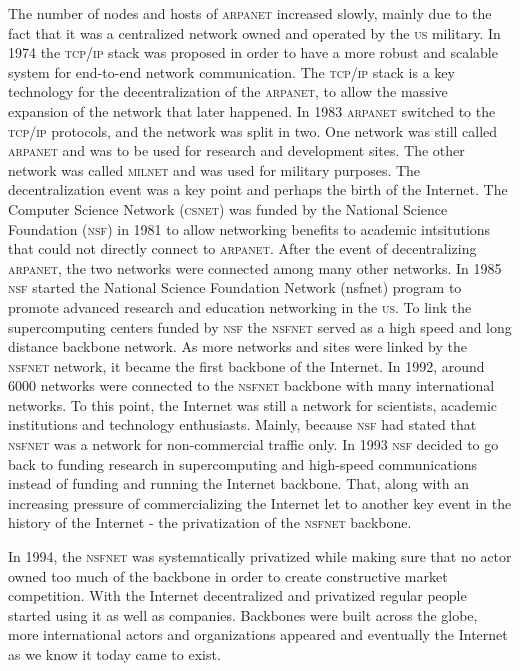 \documentclass[a4paper,11pt]{kth-mag}
\begin{document}
        The number of nodes and hosts of \textsc{arpanet} increased slowly, mainly due to the fact that it was a centralized network owned and operated by the \textsc{us} military.
        In 1974 the \textsc{tcp/ip} stack was proposed in order to have a more robust and scalable system for end-to-end network communication.
        The \textsc{tcp/ip} stack is a key technology for the decentralization of the \textsc{arpanet}, to allow the massive expansion of the network that later happened.
        In 1983 \textsc{arpanet} switched to the \textsc{tcp/ip} protocols, and the network was split in two.
        One network was still called \textsc{arpanet} and was to be used for research and development sites.
        The other network was called \textsc{milnet} and was used for military purposes.
        The decentralization event was a key point and perhaps the birth of the Internet.
        The Computer Science Network (\textsc{csnet}) was funded by the National Science Foundation (\textsc{nsf}) in 1981 to allow networking benefits to academic intsitutions that could not directly connect to \textsc{arpanet}.
        After the event of decentralizing \textsc{arpanet}, the two networks were connected among many other networks.
        In 1985 \textsc{nsf} started the National Science Foundation Network (nsfnet) program to promote advanced research and education networking in the \textsc{us}.
        To link the supercomputing centers funded by \textsc{nsf} the \textsc{nsfnet} served as a high speed and long distance backbone network.
        As more networks and sites were linked by the \textsc{nsfnet} network, it became the first backbone of the Internet.
        In 1992, around 6000 networks were connected to the \textsc{nsfnet} backbone with many international networks.
        To this point, the Internet was still a network for scientists, academic institutions and technology enthusiasts.
        Mainly, because \textsc{nsf} had stated that \textsc{nsfnet} was a network for non-commercial traffic only.
        In 1993 \textsc{nsf} decided to go back to funding research in supercomputing and high-speed communications instead of funding and running the Internet backbone.
        That, along with an increasing pressure of commercializing the Internet let to another key event in the history of the Internet - the privatization of the \textsc{nsfnet} backbone.

        In 1994, the \textsc{nsfnet} was systematically privatized while making sure that no actor owned too much of the backbone in order to create constructive market competition.
        With the Internet decentralized and privatized regular people started using it as well as companies.
        Backbones were built across the globe, more international actors and organizations appeared and eventually the Internet as we know it today came to exist.
\end{document}
